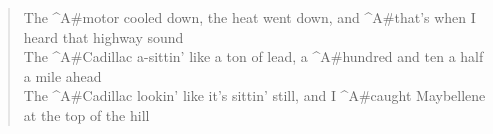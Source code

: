 \begin{chorus}
\end{chorus} 

\begin{verse}
The ^{A#}motor cooled down, the heat went down, and ^{A#}that's when I heard that highway sound \\
The ^{A#}Cadillac a-sittin' like a ton of lead, a ^{A#}hundred and ten a half a mile ahead \\
The ^{A#}Cadillac lookin' like it's sittin' still, and I ^{A#}caught Maybellene at the top of the hill
\end{verse}

\begin{chorus}
\end{chorus} 

